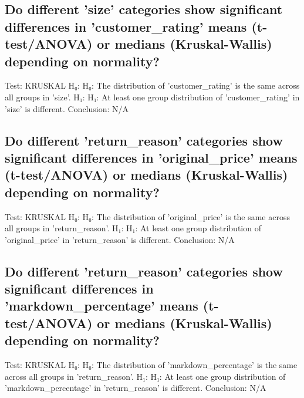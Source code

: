 \documentclass{article}%
\begin{document}
%
\subsection{Do different 'size' categories show significant differences in 'customer\_rating' means (t{-}test/ANOVA) or medians (Kruskal{-}Wallis) depending on normality?}%
\label{subsec:Dodifferentsizecategoriesshowsignificantdifferencesincustomerratingmeans(t{-}test/ANOVA)ormedians(Kruskal{-}Wallis)dependingonnormality?}%
Test: KRUSKAL\newline%
H₀: H₀: The distribution of 'customer\_rating' is the same across all groups in 'size'.\newline%
H₁: H₁: At least one group distribution of 'customer\_rating' in 'size' is different.\newline%
Conclusion: N/A

%
\subsection{Do different 'return\_reason' categories show significant differences in 'original\_price' means (t{-}test/ANOVA) or medians (Kruskal{-}Wallis) depending on normality?}%
\label{subsec:Dodifferentreturnreasoncategoriesshowsignificantdifferencesinoriginalpricemeans(t{-}test/ANOVA)ormedians(Kruskal{-}Wallis)dependingonnormality?}%
Test: KRUSKAL\newline%
H₀: H₀: The distribution of 'original\_price' is the same across all groups in 'return\_reason'.\newline%
H₁: H₁: At least one group distribution of 'original\_price' in 'return\_reason' is different.\newline%
Conclusion: N/A

%
\subsection{Do different 'return\_reason' categories show significant differences in 'markdown\_percentage' means (t{-}test/ANOVA) or medians (Kruskal{-}Wallis) depending on normality?}%
\label{subsec:Dodifferentreturnreasoncategoriesshowsignificantdifferencesinmarkdownpercentagemeans(t{-}test/ANOVA)ormedians(Kruskal{-}Wallis)dependingonnormality?}%
Test: KRUSKAL\newline%
H₀: H₀: The distribution of 'markdown\_percentage' is the same across all groups in 'return\_reason'.\newline%
H₁: H₁: At least one group distribution of 'markdown\_percentage' in 'return\_reason' is different.\newline%
Conclusion: N/A
\end{document}
